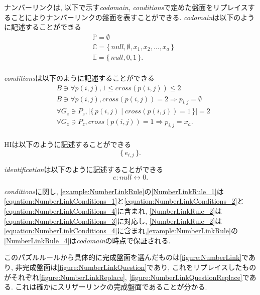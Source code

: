 \begin{example}[ナンバーリンクの数学的記述]
  ナンバーリンクは, 以下で示す\textit{codomain}, \textit{conditions}で定めた盤面をリプレイスすることによりナンバーリンクの盤面を表すことができる.
  \textit{codomain}は以下のように記述することができる
  \begin{align}
     & \mathbb{P}=\emptyset                                             \\
     & \mathbb{C}=\{\,\textit{null}, \emptyset ,x_1,x_2,\ldots, x_a\,\} \\
     & \mathbb{E}=\{\,\textit{null},0,1\,\}          .                  \\
  \end{align}

  \textit{conditions}は以下のように記述することができる
  \begin{align}
     & B\ni \forall p(i,j),1\le \textit{cross}(p(i,j))\le 2                          \label{equation:NumberLinkConditions_1}   \\
     & B\ni \forall p(i,j),  \textit{cross}(p(i,j))= 2 \Rightarrow p_{i,j}=\emptyset \label{equation:NumberLinkConditions_2}   \\
     & \forall G_z\ni P_z,        |\{\,p(i,j)\mid cross(p(i,j))=1\,\}|=2             \label{equation:NumberLinkConditions_3}   \\
     & \forall G_z\ni P_z,     \textit{cross}(p(i,j))= 1 \Rightarrow p_{i,j}=x_a     \label{equation:NumberLinkConditions_4} . \\
  \end{align}

  HIは以下のように記述することができる
  \begin{equation}
    \{\,e_{i,j}\,\}.
  \end{equation}

  \textit{identification}は以下のように記述することができる
  \begin{equation}
    e:\textit{null}\leftrightarrow 0.
  \end{equation}

  \textit{conditions}に関し, \cref{example:NumberLinkRule}の\ref{NumberLinkRule_1}は\cref{equation:NumberLinkConditions_1}と\cref{equation:NumberLinkConditions_2}と\cref{equation:NumberLinkConditions_4}に含まれ, \ref{NumberLinkRule_2}は\cref{equation:NumberLinkConditions_3}に対応し, \ref{NumberLinkRule_2}は\cref{equation:NumberLinkConditions_4}に含まれ,\cref{example:NumberLinkRule}の\ref{NumberLinkRule_4}は\textit{codomain}の時点で保証される.

  このパズルルールから具体的に完成盤面を選んだものは\cref{figure:NumberLink}であり, 非完成盤面は\cref{figure:NumberLinkQuestion}であり, これをリプレイスしたものがそれぞれ\cref{figure:NumberLinkReplace}, \cref{figure:NumberLinkQuestionReplace}である. これは確かにスリザーリンクの完成盤面であることが分かる.
\end{example}

